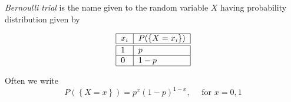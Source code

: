 \documentclass[smaller, handout]{beamer}\usepackage[]{graphicx}\usepackage[]{color}
\begin{document}
\begin{frame}{\secname}%
\begin{definition}

\textit{Bernoulli trial} is the name given to the random variable $X$ having probability distribution given by%

\begin{equation*}
\begin{tabular}{|l|l|}
\hline
$x_i$ & $P(\left\{ X=x_i\right\}) $ \\ \hline\hline
$1$ & $p$ \\ \hline
$0$ & $1-p$ \\ \hline
\end{tabular}%
\end{equation*}
\end{definition}

\vspace{0.5cm}

Often we write%
\begin{equation*}
P(\left\{ X=x\right\} ) =p^{x}\left( 1-p\right) ^{1-x}, \quad \text{ for }x=0,1
\end{equation*}

\end{frame}%
\end{document}
